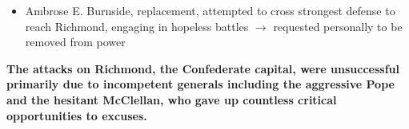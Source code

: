 \documentclass[a4paper]{article}
\begin{document}
{\begin{itemize}
\begin{itemize}
            \item \textbf{Sharpsburg} saw bloodiest single-day battle w/ 6,000 killed, Confederate forces near breaking point but after Jackson's troops arrived, McClellan allowed easy retreat $\to$ soon removed permanently
        \end{itemize}
        \item Ambrose E. Burnside, replacement, attempted to cross strongest defense to reach Richmond, engaging in hopeless battles $\to$ requested personally to be removed from power
    \end{itemize}
    \textbf{The attacks on Richmond, the Confederate capital, were unsuccessful primarily due to incompetent generals including the aggressive Pope and the hesitant McClellan, who gave up countless critical opportunities to excuses.}}
\end{document}
